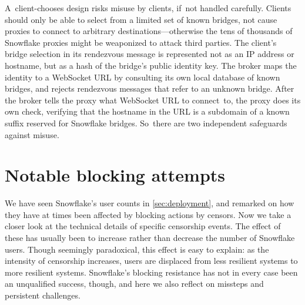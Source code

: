 \documentclass[letterpaper,twocolumn]{article}
\begin{document}
A~client-chooses design risks
misuse by clients, if~not handled carefully.
Clients should only be able to select from
a limited set of known bridges,
not cause proxies to connect to arbitrary destinations---otherwise
the tens of thousands of Snowflake proxies might be weaponized
to attack third parties.
The client's bridge selection
in its rendezvous message is represented
not as an IP address or hostname,
but as a hash of the bridge's public identity key.
The broker maps the identity to a WebSocket URL
by consulting its own local database of known bridges,
and rejects rendezvous messages that refer to an unknown bridge.
After the broker tells the proxy what WebSocket URL to connect~to,
the proxy does its own check,
verifying that the hostname in the URL is a subdomain of
a known suffix reserved for Snowflake bridges.
So~there are two independent safeguards against misuse.


\section{Notable blocking attempts}
\label{sec:block}

We have seen Snowflake's user counts in \autoref{sec:deployment},
and remarked on how they have at times been affected by blocking actions by censors.
Now we take a closer look at the technical details of specific censorship events.
The effect of these has usually been to increase rather than decrease
the number of Snowflake users.
Though seemingly paradoxical, this effect is easy to explain:
as the intensity of censorship increases,
users are displaced from less resilient systems
to more resilient systems.
Snowflake's blocking resistance has not in every case been an unqualified success,
though, and here we also reflect on missteps
and persistent challenges.
\end{document}
